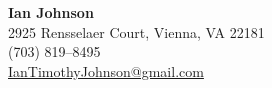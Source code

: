 \begin{center}
    {\Large\bfseries Ian Johnson} \\
    2925 Rensselaer Court, Vienna, VA 22181 \\
    (703) 819--8495 \\
    \href{mailto:IanTimothyJohnson@gmail.com}{IanTimothyJohnson@gmail.com}
\end{center}
